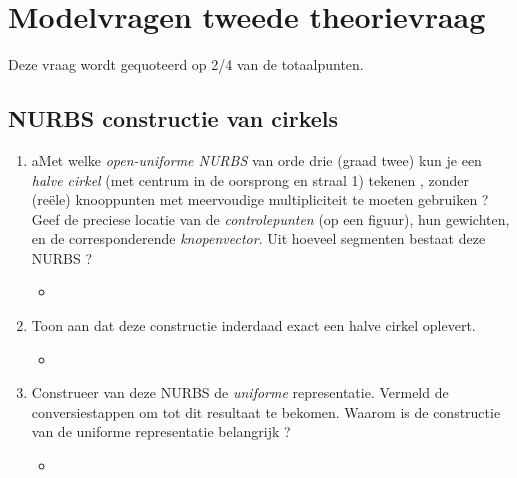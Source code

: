 \documentclass{report}
\newcommand{\vraag}[2]{
	\item #1
	
	#2
}
\begin{document}
	\chapter{Modelvragen tweede theorievraag}
	Deze vraag wordt gequoteerd op 2/4 van de totaalpunten.
	
	\section{NURBS constructie van cirkels }
	\begin{enumerate}
		\vraag{aMet welke \textit{open-uniforme NURBS} van orde drie (graad twee) kun je een \textit{halve cirkel} (met centrum in de oorsprong en straal 1) tekenen , zonder (reële) knooppunten met meervoudige multipliciteit te moeten gebruiken ? Geef de preciese locatie van de \textit{controlepunten} (op een figuur), hun gewichten, en de corresponderende \textit{knopenvector}. Uit hoeveel segmenten bestaat deze NURBS ?}{\begin{itemize} \item {} \end{itemize}}
		
		\vraag{Toon aan dat deze constructie inderdaad exact een halve cirkel oplevert.}{\begin{itemize} \item {} \end{itemize}}
		
		\vraag{Construeer van deze NURBS de \textit{uniforme} representatie. Vermeld de conversiestappen om tot dit resultaat te bekomen. Waarom is de constructie van de uniforme representatie belangrijk ?}{\begin{itemize} \item \todo{oplossen} \end{itemize}}
	\end{enumerate}
\end{document}
